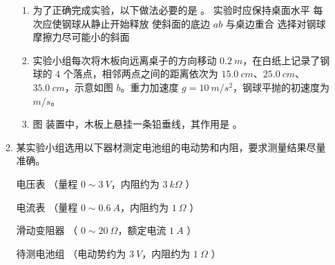\begin{enumerate}
\begin{enumerate}
\begin{enumerate}
	\item
为了正确完成实验，以下做法必要的是 \underlinegap 。
\fourchoices
{实验时应保持桌面水平}
{每次应使钢球从静止开始释放}
{使斜面的底边 $ ab $ 与桌边重合}
{选择对钢球摩擦力尽可能小的斜面}

\item 
实验小组每次将木板向远离桌子的方向移动 $ 0.2 \ m $，在白纸上记录了钢球的 $ 4 $ 个落点，相邻两点之间的距离依次为 $ 15.0 \ cm $、$ 25.0 \ cm $、$ 35.0 \ cm $，示意如图 $ b $。重力加速度 $ g=10 \ m/s^{2} $，钢球平抛的初速度为 \underlinegap $ m/s $。

\item 
图  装置中，木板上悬挂一条铅垂线，其作用是 \hfullline 。

\end{enumerate}







\item 
某实验小组选用以下器材测定电池组的电动势和内阻，要求测量结果尽量准确。


电压表 \qquad （量程 $ 0 \sim 3 \ V $，内阻约为 $ 3 \ k \Omega $ ）

电流表 \qquad （量程 $ 0 \sim 0.6 \ A $，内阻约为 $ 1 \ \Omega $ ）

滑动变阻器 \qquad （ $ 0 \sim 20 \ \Omega $，额定电流 $ 1 \ A $ ）

待测电池组 \qquad （电动势约为 $ 3 \ V $，内阻约为 $ 1 \ \Omega $ ）


\end{enumerate}
\end{enumerate}
